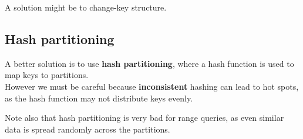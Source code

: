 A solution might be to change-key structure.

\subsection{Hash partitioning}
A better solution is to use \textbf{hash partitioning}, where a hash function is used to map keys to partitions.\\
However we must be careful because \textbf{inconsistent} hashing can lead to hot spots, as the hash function may not distribute keys evenly.

Note also that hash partitioning is very bad for range queries, as even similar data is spread randomly across the partitions.



